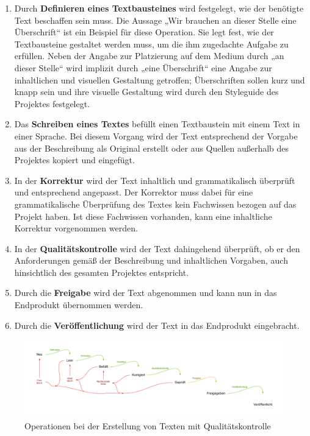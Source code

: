 \begin{enumerate}
\item{Durch \textbf{Definieren eines Textbausteines} wird festgelegt, wie der benötigte Text beschaffen sein muss. Die Aussage „Wir brauchen an dieser Stelle eine Überschrift“ ist ein Beispiel für diese Operation. Sie legt fest, wie der Textbausteine gestaltet werden muss, um die ihm zugedachte Aufgabe zu erfüllen. Neben der Angabe zur Platzierung auf dem Medium durch „an dieser Stelle“ wird implizit durch „eine Überschrift“ eine Angabe zur inhaltlichen und visuellen Gestaltung getroffen; Überschriften sollen kurz und knapp sein und ihre visuelle Gestaltung wird durch den Styleguide des Projektes festgelegt.}
\item{Das \textbf{Schreiben eines Textes} befüllt einen Textbaustein mit einem Text in einer Sprache. Bei diesem Vorgang wird der Text entsprechend der Vorgabe aus der Beschreibung als Original erstellt oder aus Quellen außerhalb des Projektes kopiert und eingefügt. }
\item{In der \textbf{Korrektur} wird der Text inhaltlich und grammatikalisch überprüft und entsprechend angepasst. Der Korrektor muss dabei für eine grammatikalische Überprüfung des Textes kein Fachwissen bezogen auf das Projekt haben. Ist diese Fachwissen vorhanden, kann eine inhaltliche Korrektur vorgenommen werden.}
\item{In der \textbf{Qualitätskontrolle} wird der Text dahingehend überprüft, ob er den Anforderungen gemäß der Beschreibung und inhaltlichen Vorgaben, auch hinsichtlich des gesamten Projektes entspricht. }
\item{Durch die \textbf{Freigabe} wird der Text abgenommen und kann nun in das Endprodukt übernommen werden.}
\item{Durch die \textbf{Veröffentlichung} wird der Text in das Endprodukt eingebracht.}
\end{enumerate}

\begin{figure}[htb]
\begin{center}
\includegraphics[width=\textwidth]{media/chart-4.pdf}
\end{center}
\caption{Operationen bei der Erstellung von Texten mit Qualitätskontrolle}
\label{chart:4}
\end{figure}

